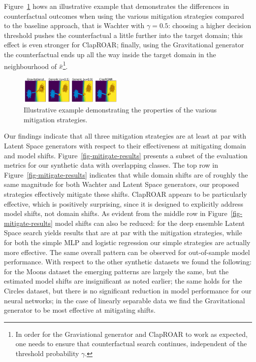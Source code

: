 \documentclass[
  conference]{IEEEtran}
\begin{document}
Figure~\ref{fig-mitigation} hows an illustrative example that
demonstrates the differences in counterfactual outcomes when using the
various mitigation strategies compared to the baseline approach, that is
Wachter with \(\gamma=0.5\): choosing a higher decision threshold pushes
the counterfactual a little further into the target domain; this effect
is even stronger for ClapROAR; finally, using the Gravitational
generator the counterfactual ends up all the way inside the target
domain in the neighbourhood of \(\bar{x}\)\footnote{In order for the
  Graviational generator and ClapROAR to work as expected, one needs to
  ensure that counterfactual search continues, independent of the
  threshold probability \(\gamma\).}.

\begin{figure}

{\centering \includegraphics[width=0.45\textwidth,height=\textheight]{www/mitigation.png}

}

\caption{\label{fig-mitigation}Illustrative example demonstrating the
properties of the various mitigation strategies.}

\end{figure}

Our findings indicate that all three mitigation strategies are at least
at par with Latent Space generators with respect to their effectiveness
at mitigating domain and model shifts. Figure~\ref{fig-mitigate-results}
presents a subset of the evaluation metrics for our synthetic data with
overlapping classes. The top row in Figure~\ref{fig-mitigate-results}
indicates that while domain shifts are of roughly the same magnitude for
both Wachter and Latent Space generators, our proposed strategies
effectively mitigate these shifts. ClapROAR appears to be particularly
effective, which is positively surprising, since it is designed to
explicitly address model shifts, not domain shifts. As evident from the
middle row in Figure~\ref{fig-mitigate-results} model shifts can also be
reduced: for the deep ensemble Latent Space search yields results that
are at par with the mitigation strategies, while for both the simple MLP
and logistic regression our simple strategies are actually more
effective. The same overall pattern can be observed for out-of-sample
model performance. With respect to the other synthetic datasets we found
the following: for the Moons dataset the emerging patterns are largely
the same, but the estimated model shifts are insignificant as noted
earlier; the same holds for the Circles dataset, but there is no
significant reduction in model performance for our neural networks; in
the case of linearly separable data we find the Gravitational generator
to be most effective at mitigating shifts.
\end{document}
